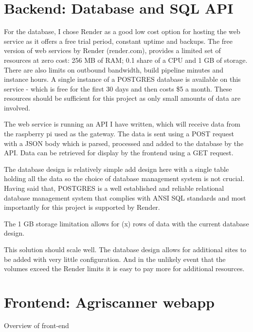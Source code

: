 \section{Backend: Database and SQL API}

For the database, I chose Render as a good low cost option for hosting the web
service as it offers a free trial period, constant uptime and backups. The free
version of web services by Render (render.com), provides a limited set of
resources at zero cost: 256 MB of RAM; 0.1 share of a CPU and 1 GB of storage.
There are also limits on outbound bandwidth, build pipeline minutes and instance
hours. A single instance of a POSTGRES database is available on this service -
which is free for the first 30 days and then costs \$5 a month. These resources
should be sufficient for this project as only small amounts of data are
involved.

The web service is running an API I have written, which will receive data from
the raspberry pi used as the gateway. The data is sent using a POST request with
a JSON body which is parsed, processed and added to the database by the API.
Data can be retrieved for display by the frontend using a GET request.

The database design is relatively simple  add design here with a single table
holding all the data so the choice of database management system is not crucial.
Having said that, POSTGRES is a well established and reliable relational
database management system that complies with ANSI SQL standards and most
importantly for this project is supported by Render. 

The 1 GB storage limitation allows for (x) rows of data with the current
database design.

This solution should scale well. The database design allows for additional sites
to be added with very little configuration. And in the unlikely event that the
volumes exceed the Render limits it is easy to pay more for additional
resources.


\section{Frontend: Agriscanner webapp}

Overview of front-end